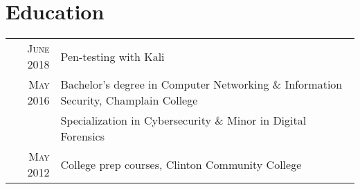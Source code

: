 \documentclass[a4paper,10pt]{article}
\begin{document}
\section{Education}
\begin{tabular}{rl}
    \hspace{4mm}\textsc{June 2018} & \footnotesize{Pen-testing with Kali}\\
    \hspace{4mm}\textsc{May 2016} & \footnotesize{Bachelor's degree in  Computer Networking \& Information Security, Champlain College}\\
                          & \footnotesize{Specialization in Cybersecurity \& Minor in Digital Forensics}\\
    \hspace{4mm}\textsc{May 2012} & \footnotesize{College prep courses, Clinton Community College}\\
\end{tabular}
\end{document}
